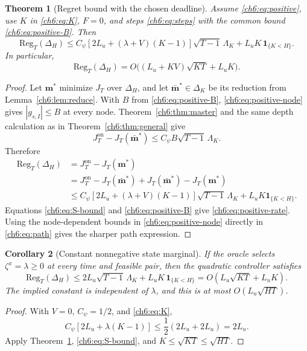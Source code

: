\documentclass[11pt]{article}
\newcommand{\Reg}{\mathrm{Reg}}
\newcommand{\ind}[1]{\mathbf{1}_{\{#1\}}}
\theoremstyle{plain}
\newtheorem{Thm:Theorem}{Theorem}[section]
\newtheorem{Thm:Corollary}[Thm:Theorem]{Corollary}
\theoremstyle{remark}
\numberwithin{equation}{section}
\begin{document}
\begin{Thm:Theorem}[Regret bound with the chosen deadline]\label{ch6:thm:positive}
Assume \eqref{ch6:eq:positive}, use $K$ in \eqref{ch6:eq:K}, $F=0$, and steps
\eqref{ch6:eq:steps} with the common bound \eqref{ch6:eq:positive-B}. Then
\begin{equation}\label{ch6:eq:positive-upper}
 \boxed{\Reg_T(\Delta_H)\le
 {C_\psi}[2L_u+(\lambda+V)(K-1)]\sqrt{T-1}\,\Lambda_K
 +L_uK\,\ind{K<H}.}
\end{equation}
In particular,
\begin{equation}\label{ch6:eq:positive-rate}
 \Reg_T(\Delta_H)=O\bigl((L_u+KV)\sqrt{KT}+L_uK\bigr).
\end{equation}
\end{Thm:Theorem}
\begin{proof}
Let $\mathbf m^*$ minimize $J_T$ over $\Delta_{H}$, and let
$\bar{\mathbf m}^*\in\Delta_K$ be its reduction from
Lemma~\ref{ch6:lem:reduce}.  With $B$ from \eqref{ch6:eq:positive-B},
\eqref{ch6:eq:positive-node} gives $|g_{s,I}|\le B$ at every node.
Theorem~\ref{ch6:thm:master} and the same depth calculation as in
Theorem~\ref{ch6:thm:general} give
\[
J_T^{\mathrm{on}}-J_T(\bar{\mathbf m}^*)
\le C_\psi B\sqrt{T-1}\,\Lambda_K.
\]
Therefore
\begin{align*}
\Reg_T(\Delta_H)
&=J_T^{\mathrm{on}}-J_T(\mathbf m^*)\\
&=J_T^{\mathrm{on}}-J_T(\bar{\mathbf m}^*)
  +J_T(\bar{\mathbf m}^*)-J_T(\mathbf m^*)\\
&\le C_\psi[2L_u+(\lambda+V)(K-1)]
  \sqrt{T-1}\,\Lambda_K
  +L_uK\ind{K<H}.
\end{align*}
Equations \eqref{ch6:eq:S-bound} and \eqref{ch6:eq:positive-B} give
\eqref{ch6:eq:positive-rate}.
Using the node-dependent bounds in \eqref{ch6:eq:positive-node} directly
in \eqref{ch6:eq:path} gives the sharper path expression.
\end{proof}

\begin{Thm:Corollary}[Constant nonnegative state marginal]\label{ch6:cor:constant}
If the oracle selects $\zeta^x=\lambda\ge0$ at every time and feasible pair,
then the quadratic controller satisfies
\begin{equation}\label{ch6:eq:constant}
 \Reg_T(\Delta_H)\le2L_u\sqrt{T-1}\,\Lambda_K
 +L_uK\,\ind{K<H}
 =O(L_u\sqrt{KT}+L_uK).
\end{equation}
The implied constant is independent of $\lambda$, and this is at most
$O(L_u\sqrt{HT})$.
\end{Thm:Corollary}
\begin{proof}
With $V=0$, $C_\psi=1/2$, and \eqref{ch6:eq:K},
\[
C_\psi[2L_u+\lambda(K-1)]
\le\frac12(2L_u+2L_u)=2L_u.
\]
Apply Theorem~\ref{ch6:thm:positive}, \eqref{ch6:eq:S-bound}, and
$K\le\sqrt{KT}\le\sqrt{HT}$.
\end{proof}
\end{document}
